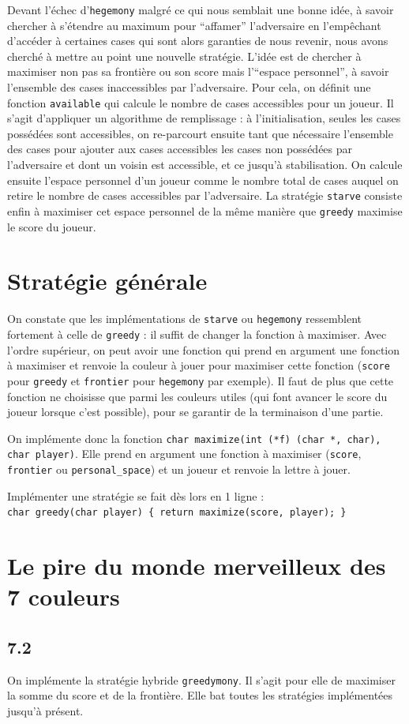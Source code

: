\documentclass[12pt]{article}
\def\question#1{\subsection*{#1}}
\def\sec#1{\section{#1}}
\begin{document}
Devant l'échec d'\texttt{hegemony} malgré ce qui nous semblait une bonne idée, à savoir chercher à s'étendre au maximum pour ``affamer'' l'adversaire en l'empêchant d'accéder à certaines cases qui sont alors garanties de nous revenir, nous avons cherché à mettre au point une nouvelle stratégie. L'idée est de chercher à maximiser non pas sa frontière ou son score mais l'``espace personnel'', à savoir l'ensemble des cases inaccessibles par l'adversaire. Pour cela, on définit une fonction \texttt{available} qui calcule le nombre de cases accessibles pour un joueur. Il s'agit d'appliquer un algorithme de remplissage : à l'initialisation, seules les cases possédées sont accessibles, on re-parcourt ensuite tant que nécessaire l'ensemble des cases pour ajouter aux cases accessibles les cases non possédées par l'adversaire et dont un voisin est accessible, et ce jusqu'à stabilisation. On calcule ensuite l'espace personnel d'un joueur comme le nombre total de cases auquel on retire le nombre de cases accessibles par l'adversaire. La stratégie \texttt{starve} consiste enfin à maximiser cet espace personnel de la même manière que \texttt{greedy} maximise le score du joueur.

\sec{Stratégie générale}
On constate que les implémentations de \texttt{starve} ou \texttt{hegemony} ressemblent fortement à celle de \texttt{greedy} : il suffit de changer la fonction à maximiser. Avec l'ordre supérieur, on peut avoir une fonction qui prend en argument une fonction à maximiser et renvoie la couleur à jouer pour maximiser cette fonction (\texttt{score} pour \texttt{greedy} et \texttt{frontier} pour \texttt{hegemony} par exemple). Il faut de plus que cette fonction ne choisisse que parmi les couleurs utiles (qui font avancer le score du joueur lorsque c'est possible), pour se garantir de la terminaison d'une partie.

On implémente donc la fonction \texttt{char maximize(int (*f) (char *, char), char player)}. Elle prend en argument une fonction à maximiser (\texttt{score}, \texttt{frontier} ou \texttt{personal\_space}) et un joueur et renvoie la lettre à jouer.

Implémenter une stratégie se fait dès lors en 1 ligne :\\
\texttt{char greedy(char player) \{ return maximize(score, player); \}}


\sec{Le pire du monde merveilleux des 7 couleurs}
\question{7.2}
On implémente la stratégie hybride \texttt{greedymony}. Il s'agit pour elle de maximiser la somme du score et de la frontière. Elle bat toutes les stratégies implémentées jusqu'à présent.
\end{document}
